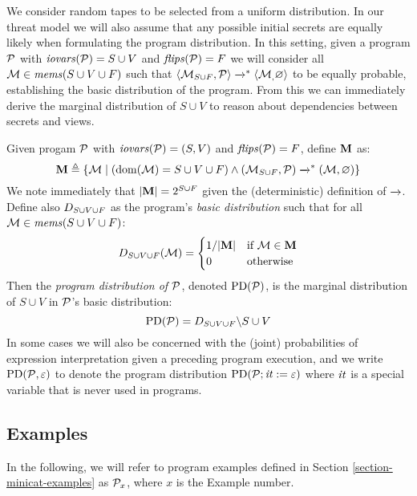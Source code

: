 We consider random tapes to be selected from a uniform distribution.
In our threat model we will also assume that any possible initial
secrets are equally likely when formulating the program distribution.
In this setting, given a program $\mathcal{P}$ with $\mathit{iovars}(\mathcal{P}) = S \cup
V$ and $\mathit{flips}(\mathcal{P}) = F$ we will consider all $\mathcal{M}
\in \mathit{mems}(S \cup V \cup F)$ such that
$
\langle \mathcal{M}_{S \cup F},\mathcal{P} \rangle \xrightarrow{}^{*} \langle \mathcal{M}_,\varnothing \rangle
$
to be equally probable, establishing the basic distribution of the
program. From this we can immediately derive the marginal distribution
of $S \cup V$ to reason about dependencies between secrets and views. 
\begin{definition}
  \label{def-progd}
  Given progam $\mathcal{P}$ with $\mathit{iovars}(\mathcal{P}) = (S,V)$ and $\mathit{flips}(\mathcal{P}) = F$, define $\mathbf{M}$ as:
  $$
  \mathbf{M} \triangleq \{ \mathcal{M} \mid (\mathrm{dom}(\mathcal{M}) = S \cup V \cup F) \wedge (\mathcal{M}_{S \cup F},\mathcal{P}) \xrightarrow{}^{*} (\mathcal{M},\varnothing) \}
  $$
  We note immediately that $|\mathbf{M}| = 2^{S \cup F}$ given the (deterministic) definition of $\xrightarrow{}$. 
  Define also $D_{S \cup V \cup F}$ as the program's \emph{basic distribution} such that for all
  $\mathcal{M} \in \mathit{mems}(S \cup V \cup F)$:
  $$
  D_{S \cup V \cup F}(\mathcal{M}) =
  \begin{cases}
    1 / |\mathbf{M}| & \text{if}\ \mathcal{M} \in \mathbf{M}\\
    0 & \text{otherwise}
  \end{cases}
  $$
  Then the \emph{program distribution of $\mathcal{P}$}, denoted $\mathrm{PD}(\mathcal{P})$, is the
  marginal distribution of $S \cup V$ in $\mathcal{P}$'s basic distribution:
  $$
  \mathrm{PD}(\mathcal{P}) =  D_{S \cup V \cup F}\backslash S\cup V
  $$
  In some cases we will also be concerned with the (joint)
  probabilities of expression interpretation given a preceding program
  execution, and we write $\mathrm{PD}(\mathcal{P}, \varepsilon)$ to denote the program
  distribution $\mathrm{PD}(\mathcal{P};\mathit{it} := \varepsilon)$ where $\mathit{it}$ is a
  special variable that is never used in programs.
\end{definition}


\subsection{Examples}
\label{section-pmf-examples}

In the following, we will refer to program examples defined in
Section \ref{section-minicat-examples} as $\mathcal{P}_x$, where $x$
is the Example number. 

